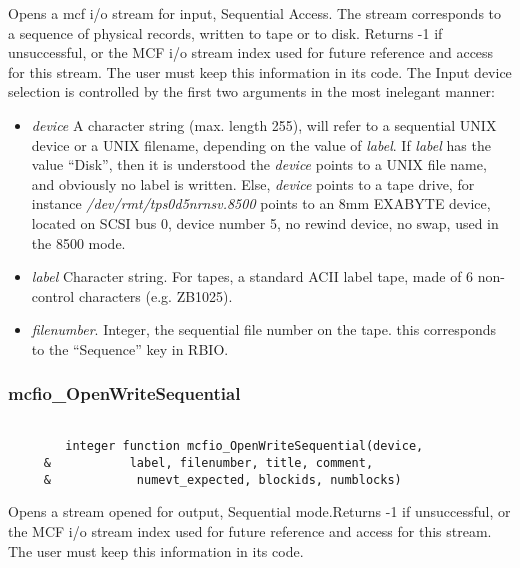  Opens a mcf i/o stream for input, Sequential Access. The stream corresponds
 to a sequence of physical records, written to tape or to disk. Returns -1
 if unsuccessful, or the MCF i/o stream index 
 used for future reference and access for this stream. The user must keep
 this information in its code. 
 The Input device selection is controlled by the first two arguments 
 in the most inelegant manner:
\begin{itemize}
 
\item {\em device} A  character
 string (max. length 255), will refer to a  sequential UNIX device or a 
 UNIX filename, depending on the value of {\em label}.  If {\em label} has 
 the value ``Disk'', then it is understood the {\em device} points to 
 a UNIX file name, and obviously no label is written. Else, {\em device} points 
 to a tape drive, for instance {\em /dev/rmt/tps0d5nrnsv.8500} points to 
 an 8mm EXABYTE device, located on SCSI bus 0, device number 5, no rewind 
 device, no swap, used in the 8500 mode.  
\item {\em label} Character string. For tapes, a standard ACII label tape, 
made of 6 non-control characters (e.g. ZB1025). 
\item {\em filenumber}. Integer, the sequential file number on the 
tape. this corresponds to the ``Sequence'' key in RBIO. 
\end{itemize}


\subsubsection{mcfio\_OpenWriteSequential}

\begin{verbatim}

        integer function mcfio_OpenWriteSequential(device,
     &           label, filenumber, title, comment,
     &            numevt_expected, blockids, numblocks)
\end{verbatim}

	Opens a stream opened for output, Sequential mode.Returns -1
 if unsuccessful, or the MCF i/o stream index 
 used for future reference and access for this stream. The user must keep
 this information in its code.
  
